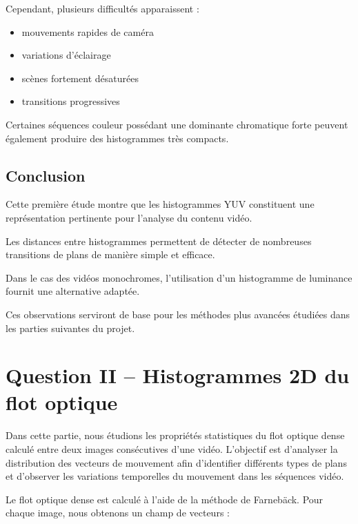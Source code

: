 \documentclass[11pt,a4paper]{article}
\begin{document}
    Cependant, plusieurs difficultés apparaissent :
    
    \begin{itemize}
        \item mouvements rapides de caméra
        \item variations d’éclairage
        \item scènes fortement désaturées
        \item transitions progressives
    \end{itemize}
    
    Certaines séquences couleur possédant une dominante chromatique forte peuvent également produire des histogrammes très compacts.
    

    \subsection*{Conclusion}
    
    
    Cette première étude montre que les histogrammes YUV constituent une représentation pertinente pour l’analyse du contenu vidéo.
    
    Les distances entre histogrammes permettent de détecter de nombreuses transitions de plans de manière simple et efficace.
    
    Dans le cas des vidéos monochromes, l’utilisation d’un histogramme de luminance fournit une alternative adaptée.
    
    Ces observations serviront de base pour les méthodes plus avancées étudiées dans les parties suivantes du projet.
    
    \section*{Question II -- Histogrammes 2D du flot optique}
    
    Dans cette partie, nous étudions les propriétés statistiques du flot optique dense calculé entre deux images consécutives d’une vidéo.  
    L’objectif est d’analyser la distribution des vecteurs de mouvement afin d’identifier différents types de plans et d’observer les variations temporelles du mouvement dans les séquences vidéo.
    
    \vspace{0.3cm}
    
    Le flot optique dense est calculé à l’aide de la méthode de Farnebäck.  
    Pour chaque image, nous obtenons un champ de vecteurs :
    
\end{document}
